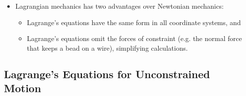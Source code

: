 \documentclass{article}
\begin{document}
\begin{itemize}
  \item Lagrangian mechanics has two advantages over Newtonian mechanics:

        \begin{itemize}
          \item Lagrange's equations have the same form in all coordinate systems, and

          \item Lagrange's equations omit the forces of constraint (e.g. the normal force that keeps a bead on a wire), simplifying calculations.
        \end{itemize}
\end{itemize}

\subsection{Lagrange's Equations for Unconstrained Motion}
\end{document}
